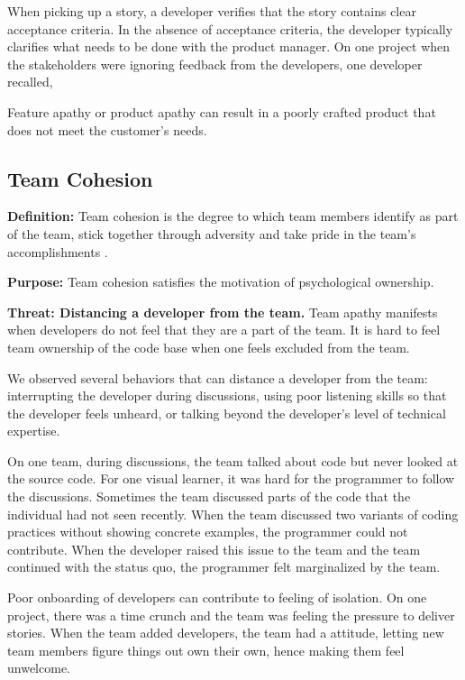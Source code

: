 When picking up a story, a developer verifies that the story contains clear acceptance criteria. In the absence of acceptance criteria, the developer typically clarifies what needs to be done with the product manager. On one project when the stakeholders were ignoring feedback from the developers, one developer recalled,  

Feature apathy or product apathy can result in a poorly crafted product that does not meet the customer's needs.

\subsection{Team Cohesion}
\textbf{Definition:} Team cohesion is the degree to which team members identify as part of the team, stick together through adversity and take pride in the team's accomplishments \cite{Bollen1990Perceived, Beal2003Cohesion, Whitworth2007Motivation}.

\textbf{Purpose:} Team cohesion satisfies the  motivation of psychological ownership.

\textbf{Threat: Distancing a developer from the team.} Team apathy manifests when developers do not feel that they are a part of the team. It is hard to feel team ownership of the code base when one feels excluded from the team.

We observed several behaviors that can distance a developer from the team: interrupting the developer during discussions, using poor listening skills so that the developer feels unheard, or talking beyond the developer's level of technical expertise. 

On one team, during discussions, the team talked about code but never looked at the source code. For one visual learner, it was hard for the programmer to follow the discussions. Sometimes the team discussed parts of the code that the individual had not seen recently. When the team discussed two variants of coding practices without showing concrete examples, the programmer could not contribute. When the developer raised this issue to the team and the team continued with the status quo, the programmer felt marginalized by the team.

Poor onboarding of developers can contribute to feeling of isolation. On one project, there was a time crunch and the team was feeling the pressure to deliver stories. When the team added developers, the team had a  attitude, letting new team members figure things out own their own, hence making them feel unwelcome.

